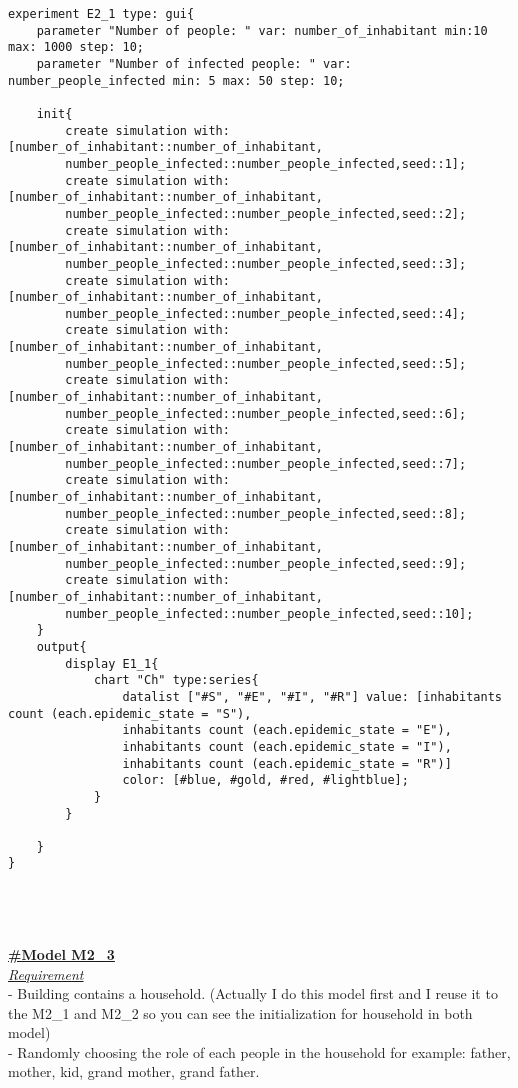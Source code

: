 \documentclass{article}
\begin{document}
\begin{lstlisting}
experiment E2_1 type: gui{
	parameter "Number of people: " var: number_of_inhabitant min:10 max: 1000 step: 10;
	parameter "Number of infected people: " var: number_people_infected min: 5 max: 50 step: 10;
	
	init{
		create simulation with:[number_of_inhabitant::number_of_inhabitant,
		number_people_infected::number_people_infected,seed::1];
		create simulation with:[number_of_inhabitant::number_of_inhabitant,
		number_people_infected::number_people_infected,seed::2];
		create simulation with:[number_of_inhabitant::number_of_inhabitant,
		number_people_infected::number_people_infected,seed::3];
		create simulation with:[number_of_inhabitant::number_of_inhabitant,
		number_people_infected::number_people_infected,seed::4];
		create simulation with:[number_of_inhabitant::number_of_inhabitant,
		number_people_infected::number_people_infected,seed::5];
		create simulation with:[number_of_inhabitant::number_of_inhabitant,
		number_people_infected::number_people_infected,seed::6];
		create simulation with:[number_of_inhabitant::number_of_inhabitant,
		number_people_infected::number_people_infected,seed::7];
		create simulation with:[number_of_inhabitant::number_of_inhabitant,
		number_people_infected::number_people_infected,seed::8];
		create simulation with:[number_of_inhabitant::number_of_inhabitant,
		number_people_infected::number_people_infected,seed::9];
		create simulation with:[number_of_inhabitant::number_of_inhabitant,
		number_people_infected::number_people_infected,seed::10];
	}
	output{
		display E1_1{
			chart "Ch" type:series{
				datalist ["#S", "#E", "#I", "#R"] value: [inhabitants count (each.epidemic_state = "S"), 
				inhabitants count (each.epidemic_state = "E"), 
				inhabitants count (each.epidemic_state = "I"), 
				inhabitants count (each.epidemic_state = "R")] 
				color: [#blue, #gold, #red, #lightblue];
			}
		}
		
	}
}
\end{lstlisting}
\\\\\\
\underline{\textbf{#Model M2\_3}}\\
\underline{\emph{Requirement}}\\
- Building contains a household. (Actually I do this model first and I reuse it to the M2\_1 and M2\_2 so you can see the initialization for household in both model)
\\
- Randomly choosing the role of each people in the household for example: father, mother, kid, grand mother, grand father.
\end{document}
